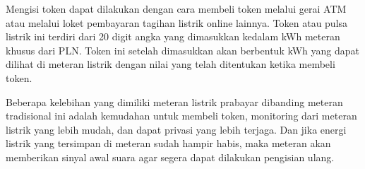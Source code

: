 Mengisi token dapat dilakukan dengan cara membeli token melalui gerai ATM atau melalui loket pembayaran tagihan listrik online lainnya. Token atau pulsa listrik ini terdiri dari 20 digit angka yang dimasukkan kedalam kWh meteran khusus dari PLN. Token ini setelah dimasukkan akan berbentuk kWh yang dapat dilihat di meteran listrik dengan nilai yang telah ditentukan ketika membeli token.

Beberapa kelebihan yang dimiliki meteran listrik prabayar dibanding meteran tradisional ini adalah kemudahan untuk membeli token, monitoring dari meteran listrik yang lebih mudah, dan dapat privasi yang lebih terjaga. Dan jika energi listrik yang tersimpan di meteran sudah hampir habis, maka meteran akan memberikan sinyal awal suara agar segera dapat dilakukan pengisian ulang.